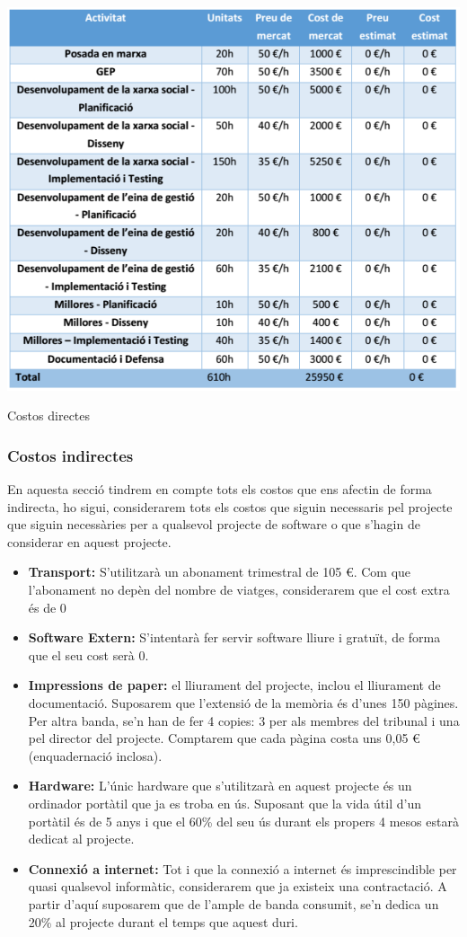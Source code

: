 \documentclass[11pt,catalan,listoffigures,listoftables]{tfgetsinf}
\begin{document}
\begin{table}[H]
\centering
\includegraphics[width=15cm]{images/taula2}
\caption[Taula 7.1]{Costos directes}
\centering
\end{table}

\subsubsection{Costos indirectes}

En aquesta secció tindrem en compte tots els costos que ens afectin de forma indirecta, ho sigui, considerarem tots els costos que siguin necessaris pel projecte que siguin necessàries per a qualsevol projecte de software o que s’hagin de considerar en aquest projecte.
\begin{itemize}
	\item \textbf{Transport:} S’utilitzarà un abonament trimestral de 105 €. Com que l’abonament no depèn del nombre de viatges, considerarem que el cost extra és de 0%
	\item \textbf{Software Extern:} S’intentarà fer servir software lliure i gratuït, de forma que el seu cost serà 0.
	\item \textbf{Impressions de paper:} el lliurament del projecte, inclou el lliurament de documentació. Suposarem que l’extensió de la memòria és d’unes 150 pàgines. Per altra banda, se’n han de fer 4 copies: 3 per als membres del tribunal i una pel director del projecte. Comptarem que cada pàgina costa uns 0,05 € (enquadernació inclosa).
	\item \textbf{Hardware:} L’únic hardware que s’utilitzarà en aquest projecte és un ordinador portàtil que ja es troba en ús. Suposant que la vida útil d’un portàtil és de 5 anys i que el 60\% del seu ús durant els propers 4 mesos estarà dedicat al projecte.
	\item \textbf{Connexió a internet:} Tot i que la connexió a internet és imprescindible per quasi qualsevol informàtic, considerarem que ja existeix una contractació. A partir d’aquí suposarem que de l’ample de banda consumit, se’n dedica un 20\% al projecte durant el temps que aquest duri.
\end{itemize} 
\end{document}
